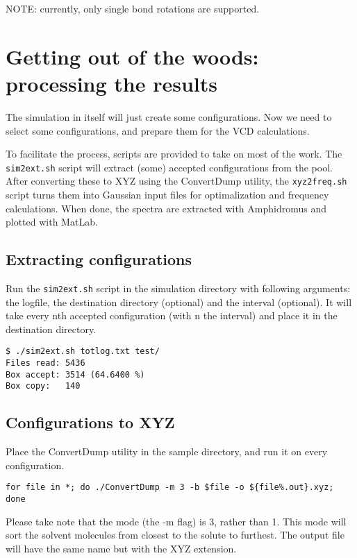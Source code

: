 NOTE: currently, only single bond rotations are supported.
	
\chapter{Getting out of the woods: processing the results}

The simulation in itself will just create some configurations. Now we need to 
select some configurations, and prepare them for the VCD calculations.

To facilitate the process, scripts are provided to take on most of the work. 
The \verb|sim2ext.sh| script will extract (some) accepted configurations from 
the 
pool. After converting these to XYZ using the ConvertDump utility, the 
\verb|xyz2freq.sh| script turns them into Gaussian input files for 
optimalization and frequency calculations.
When done, the spectra are extracted with Amphidromus and plotted with MatLab.

\section{Extracting configurations}

Run the \verb|sim2ext.sh| script in the simulation directory with following 
arguments: the logfile, the destination directory (optional) and the interval 
(optional). It will take every nth accepted configuration (with n the interval)
and place it in the destination directory.

\begin{lstlisting}[caption=The sim2ext script]
$ ./sim2ext.sh totlog.txt test/
Files read: 5436
Box accept: 3514 (64.6400 %)
Box copy:   140
\end{lstlisting}

\section{Configurations to XYZ}\label{sec:conf2xyz}

Place the ConvertDump utility in the sample directory, and run it on every 
configuration.

\begin{lstlisting}[caption=Using the ConvertDump utility to make XYZ's]
for file in *; do ./ConvertDump -m 3 -b $file -o ${file%.out}.xyz; done
\end{lstlisting}

Please take note that the mode (the -m flag) is 3, rather than 1. This mode 
will sort the solvent molecules from closest to the solute to furthest. 
The output file will have the same name but with the XYZ extension.

